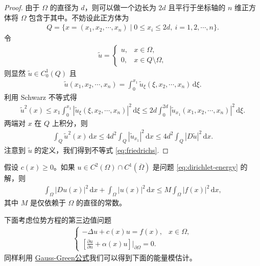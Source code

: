 \documentclass[../../main.tex]{subfiles}%
\begin{document}
\begin{proof}
由于 $\Omega$ 的直径为 $d$，则可以做一个边长为 $2d$ 且平行于坐标轴的 $n$ 维正方体将 $\Omega$ 包含于其中。不妨设此正方体为
\begin{align*}
Q = \{x=(x_1,x_2,\cdots,x_n) \mid 0\leqslant x_i\leqslant 2d,\ i=1,2,\cdots,n\}.
\end{align*}
令
\begin{align*}
\tilde{u} = \begin{cases}
u, & x\in\Omega, \\
0, & x\in Q\setminus\Omega,
\end{cases}
\end{align*}
则显然 $\tilde{u}\in C_0^1(Q)$ 且
\begin{align*}
\tilde{u}(x_1,x_2,\cdots,x_n) = \int_0^{x_1} \tilde{u}_\xi(\xi,x_2,\cdots,x_n)\,\mathrm{d}\xi.
\end{align*}
利用 Schwarz 不等式得
\begin{align*}
\tilde{u}^2(x)\leqslant x_1\int_0^{x_1} |\tilde{u}_\xi(\xi,x_2,\cdots,x_n)|^2\,\mathrm{d}\xi \leqslant 2d\int_0^{2d} |\tilde{u}_{x_1}(x_1,x_2,\cdots,x_n)|^2\,\mathrm{d}\xi.
\end{align*}
两端对 $x$ 在 $Q$ 上积分，则
\begin{align*}
\int_Q \tilde{u}^2(x)\,\mathrm{d}x \leqslant 4d^2\int_Q |\tilde{u}_{x_1}|^2\,\mathrm{d}x \leqslant 4d^2\int_Q |D\tilde{u}|^2\,\mathrm{d}x.
\end{align*}
注意到 $\tilde{u}$ 的定义，我们得到不等式 \eqref{eq:friedrichs}.
\end{proof}

\begin{theorem}
假设 $c(x)\geqslant 0$。如果 $u\in C^2(\Omega)\cap C^1(\overline{\Omega})$ 是问题 \eqref{eq:dirichlet-energy} 的解，则
\begin{align}
\int_\Omega |Du(x)|^2\,\mathrm{d}x + \int_\Omega |u(x)|^2\,\mathrm{d}x \leqslant M\int_\Omega |f(x)|^2\,\mathrm{d}x, \label{eq:energy-est-dir2}
\end{align}
其中 $M$ 是仅依赖于 $\Omega$ 的直径的常数。
\end{theorem}

下面考虑位势方程的第三边值问题
\begin{align}
\begin{cases}
-\Delta u + c(x)u = f(x), & x\in\Omega, \\
\left[\frac{\partial u}{\partial n} + \alpha(x)u\right]\bigg|_{\partial\Omega} = 0.
\end{cases} \label{eq:third-energy}
\end{align}
同样利用 \hyperref[Basis of Analytics-theorem:Gauss-Green公式(散度定理)]{Gauss-Green公式}我们可以得到下面的能量模估计。
\end{document}
